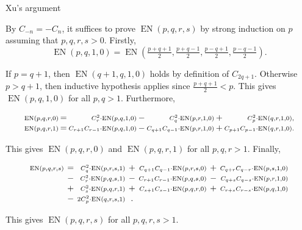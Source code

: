 \documentclass[10pt]{beamer}
\begin{document}
\begin{frame}[t]{Xu's argument}

By $ C_{-n} = -C_n $, it suffices to prove $ \operatorname{EN}(p, q, r, s) $ by strong induction on $ p $ assuming that $ p, q, r, s > 0 $. Firstly,
$$ \operatorname{EN}(p, q, 1, 0) = \operatorname{EN}(\tfrac{p + q + 1}{2}, \tfrac{p + q - 1}{2}, \tfrac{p - q + 1}{2}, \tfrac{p - q - 1}{2}). $$

If $ p = q + 1 $, then $ \operatorname{EN}(q + 1, q, 1, 0) $ holds by definition of $ C_{2q + 1} $. Otherwise $ p > q + 1 $, then inductive hypothesis applies since $ \tfrac{p + q + 1}{2} < p $. This gives $ \operatorname{EN}(p, q, 1, 0) $ for all $ p, q > 1 $. Furthermore,

\vspace{-0.5cm}
$$
\arraycolsep=1pt
\begin{array}{rcrcrcr}
\scriptstyle \operatorname{EN}(p, q, r, 0) & = & \scriptstyle C_r^2 \cdot \operatorname{EN}(p, q, 1, 0) & - & \scriptstyle C_q^2 \cdot \operatorname{EN}(p, r, 1, 0) & + & \scriptstyle C_p^2 \cdot \operatorname{EN}(q, r, 1, 0), \\
\scriptstyle \operatorname{EN}(p, q, r, 1) & = & \scriptstyle C_{r + 1}C_{r - 1} \cdot \operatorname{EN}(p, q, 1, 0) & - & \scriptstyle C_{q + 1}C_{q - 1} \cdot \operatorname{EN}(p, r, 1, 0) & + & \scriptstyle C_{p + 1}C_{p - 1} \cdot \operatorname{EN}(q, r, 1, 0).
\end{array}
$$
\vspace{-0.25cm}

This gives $ \operatorname{EN}(p, q, r, 0) $ and $ \operatorname{EN}(p, q, r, 1) $ for all $ p, q, r > 1 $. Finally,

\vspace{-0.5cm}
$$
\arraycolsep=2pt
\begin{array}{rcrcrcr}
\scriptstyle \operatorname{EN}(p, q, r, s) & = & \scriptstyle C_q^2 \cdot \operatorname{EN}(p, r, s, 1) & + & \scriptstyle C_{q + 1}C_{q - 1} \cdot \operatorname{EN}(p, r, s, 0) & + & \scriptstyle C_{q + r}C_{q - r} \cdot \operatorname{EN}(p, s, 1, 0) \\
& - & \scriptstyle C_r^2 \cdot \operatorname{EN}(p, q, s, 1) & - & \scriptstyle C_{r + 1}C_{r - 1} \cdot \operatorname{EN}(p, q, s, 0) & - & \scriptstyle C_{q + s}C_{q - s} \cdot \operatorname{EN}(p, r, 1, 0) \\
& + & \scriptstyle C_s^2 \cdot \operatorname{EN}(p, q, r, 1) & + & \scriptstyle C_{s + 1}C_{s - 1} \cdot \operatorname{EN}(p, q, r, 0) & + & \scriptstyle C_{r + s}C_{r - s} \cdot \operatorname{EN}(p, q, 1, 0) \\
& - & \scriptstyle 2C_p^2 \cdot \operatorname{EN}(q, r, s, 1) & . & & &
\end{array}
$$
\vspace{-0.25cm}

This gives $ \operatorname{EN}(p, q, r, s) $ for all $ p, q, r, s > 1 $.

\end{frame}
\end{document}
